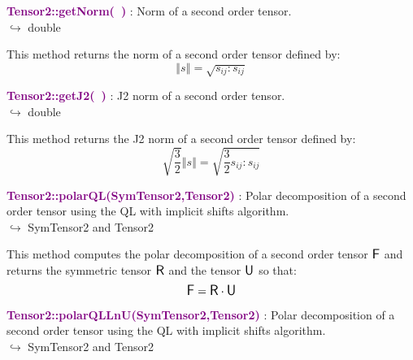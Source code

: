 \textcolor{purple}{\textbf{Tensor2::getNorm(~)}}\label{Tensor2::getNorm()} : Norm of a second order tensor.\\ \hspace*{5mm}$\hookrightarrow$ double

This method returns the norm of a second order tensor defined by:\begin{equation*}
\left\Vert s \right\Vert  = \sqrt {s_{ij}:s_{ij}}
\end{equation*}

\textcolor{purple}{\textbf{Tensor2::getJ2(~)}}\label{Tensor2::getJ2()} : J2 norm of a second order tensor.\\ \hspace*{5mm}$\hookrightarrow$ double

This method returns the J2 norm of a second order tensor defined by:
\begin{equation*}
\sqrt {\frac{3}{2}} \left\Vert s \right\Vert  = \sqrt {\frac{3}{2} s_{ij}:s_{ij}}
\end{equation*}

\textcolor{purple}{\textbf{Tensor2::polarQL(SymTensor2,Tensor2)}}\label{Tensor2::polarQL(SymTensor2,Tensor2)} : Polar decomposition of a second order tensor using the QL with implicit shifts algorithm.\\ \hspace*{5mm}$\hookrightarrow$ SymTensor2 and Tensor2

This method computes the polar decomposition of a second order tensor $\mbox{\large\ensuremath{\mathsf{F}}}$ and returns the symmetric tensor $\mbox{\large\ensuremath{\mathsf{R}}}$ and the tensor $\mbox{\large\ensuremath{\mathsf{U}}}$ so that:
\begin{equation*}
\mbox{\large\ensuremath{\mathsf{F}}} = \mbox{\large\ensuremath{\mathsf{R}}} \cdot \mbox{\large\ensuremath{\mathsf{U}}}
\end{equation*}

\textcolor{purple}{\textbf{Tensor2::polarQLLnU(SymTensor2,Tensor2)}}\label{Tensor2::polarQLLnU(SymTensor2,Tensor2)} : Polar decomposition of a second order tensor using the QL with implicit shifts algorithm.\\ \hspace*{5mm}$\hookrightarrow$ SymTensor2 and Tensor2

